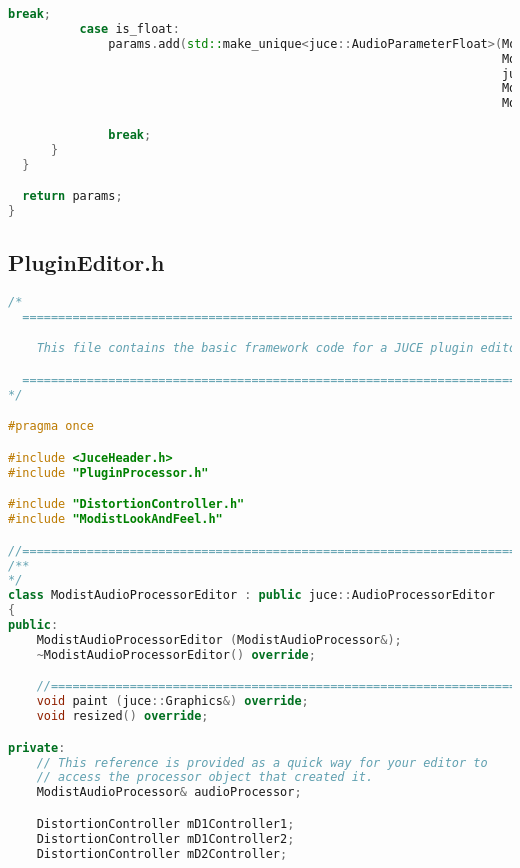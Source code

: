 \documentclass{article}
\begin{document}
\begin{appendix}
\begin{lstlisting}[language=C++]
              break;
          case is_float:
              params.add(std::make_unique<juce::AudioParameterFloat>(ModistParameterID[i],
                                                                     ModistParameterID[i],
                                                                     juce::NormalisableRange<float>(ModistParameterMin[i], ModistParameterMax[i]),
                                                                     ModistParameterDefault[i],
                                                                     ModistParameterID[i]));

              break;
      }
  }

  return params;
}

\end{lstlisting}
\pagebreak

\subsection{PluginEditor.h}
\begin{lstlisting}[language=C++]
/*
  ==============================================================================

    This file contains the basic framework code for a JUCE plugin editor.

  ==============================================================================
*/

#pragma once

#include <JuceHeader.h>
#include "PluginProcessor.h"

#include "DistortionController.h"
#include "ModistLookAndFeel.h"

//==============================================================================
/**
*/
class ModistAudioProcessorEditor : public juce::AudioProcessorEditor
{
public:
    ModistAudioProcessorEditor (ModistAudioProcessor&);
    ~ModistAudioProcessorEditor() override;

    //==============================================================================
    void paint (juce::Graphics&) override;
    void resized() override;

private:
    // This reference is provided as a quick way for your editor to
    // access the processor object that created it.
    ModistAudioProcessor& audioProcessor;

    DistortionController mD1Controller1;
    DistortionController mD1Controller2;
    DistortionController mD2Controller;


\end{lstlisting}
\end{appendix}
\end{document}

